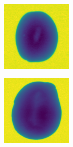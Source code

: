 \documentclass[11pt]{article}
\begin{document}
\begin{figure}[!h]
\begin{subfigure}[b]{0.22\textwidth}
         \caption{}
         \label{fig:hollow_27}
     \end{subfigure}
          \\
    \begin{subfigure}[b]{0.22\textwidth}
         \centering
         \includegraphics[width=\textwidth]{figurer/potato_dataset/hollow/hollow_28.jpg}
         \caption{}
         \label{fig:hollow_28}
     \end{subfigure}
     \hfill
     \begin{subfigure}[b]{0.22\textwidth}
         \centering
         \includegraphics[width=\textwidth]{figurer/potato_dataset/hollow/hollow_29.jpg}

\end{subfigure}
\end{figure}
\end{document}
